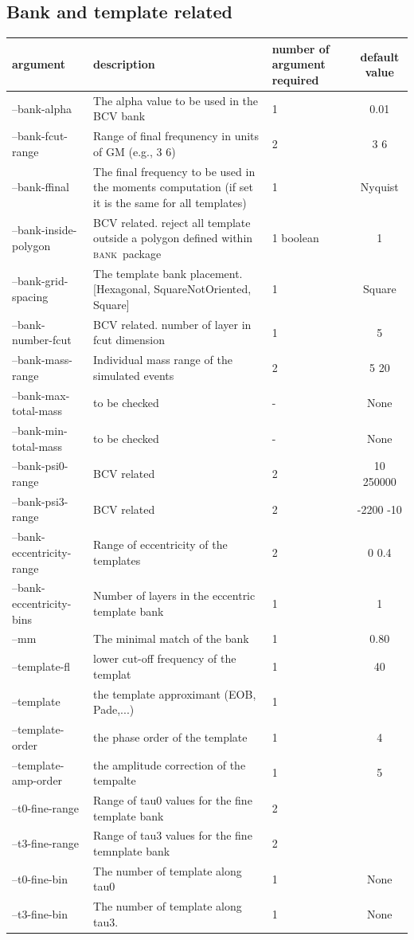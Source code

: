 \documentclass[a4paper,10pt]{article}
\newcommand{\bank}{\textsc{bank}~}
\begin{document}
\subsection{Bank and template related}
\begin{center}
\begin{tabular}{|l|p{6cm}|p{3cm}|c|}
\hline
argument &  description & number of argument required &default value \\ \hline
--bank-alpha & The alpha value to be used in the BCV bank & 1 &0.01 \\ \hline
--bank-fcut-range & Range of final frequnency in units of GM (e.g., 3 6)& 2& 3 6  \\ \hline
--bank-ffinal & The final frequency to be used in the moments computation (if set it is the same for all templates) &1 &Nyquist\\\hline
--bank-inside-polygon & BCV related. reject all template outside a polygon defined within \bank package & 1 boolean & 1\\\hline
--bank-grid-spacing & The template bank placement. [Hexagonal, SquareNotOriented, Square] & 1 & Square\\\hline
--bank-number-fcut & BCV related. number of layer in fcut dimension& 1&5\\\hline
--bank-mass-range &Individual mass range of the simulated events&2&5 20\\\hline
--bank-max-total-mass& to be checked&-& None\\\hline
--bank-min-total-mass&to be checked&-& None\\\hline
--bank-psi0-range &BCV related&2&10 250000\\\hline
--bank-psi3-range &BCV related&2&-2200 -10\\\hline
--bank-eccentricity-range & Range of eccentricity of the templates & 2 & 0 0.4 \\\hline
--bank-eccentricity-bins&Number of layers in the eccentric template bank&1&1\\\hline 
--mm &The minimal match of the bank&1&0.80\\\hline
--template-fl  &lower cut-off frequency of the templat &1&40\\\hline
--template  &the template approximant (EOB, Pade,...)&1&\\\hline
--template-order &the phase order of the template&1&4\\\hline
--template-amp-order &the amplitude correction of the tempalte&1&5\\\hline
--t0-fine-range &Range of tau0 values for the fine template bank&2&\\\hline
--t3-fine-range &Range of tau3 values for the fine temnplate bank&2&\\\hline
--t0-fine-bin &The number of template along tau0 &1&None\\\hline
--t3-fine-bin &The number of template along tau3. &1&None\\\hline

\end{tabular} 
\end{center}
\end{document}
